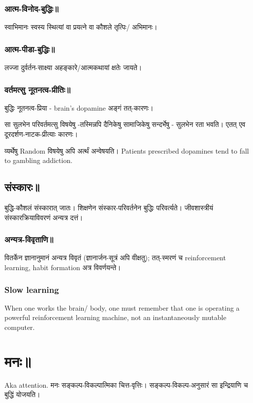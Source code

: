 \documentclass[oneside, article]{memoir}
\begin{document}
\subsection{आत्म-विनोद-बुद्धिः॥}
स्वाभिमानः स्वस्य स्थित्यां वा प्रयत्ने वा कौशले तृत्पिः/ अभिमानः।

\subsection{आत्म-पीडा-बुद्धिः॥}
लज्जा दुर्वर्तन-साक्ष्या अहङ्कारे/आत्मकथायां क्षतेः जायते।

\subsection{वर्तमत्सु नूतनत्व-प्रीतिः॥}
बुद्धिः नूतनत्व-प्रिया - brain's dopamine अङ्गं तत्-कारणः।

सा सुलभेन परिवर्तमत्सु विषयेषु -तस्मिन्नपि दैनिकेषु सामाजिकेषु सन्दर्भेषु -  सुलभेन रता भवति। एतत् एव दूरदर्शण-नाटक-प्रीत्याः कारणः।

व्यर्थेषु Random विषयेषु अपि अर्त्थं अन्वेषयति। Patients prescribed dopamines tend to fall to gambling addiction.

\section{संस्कारः॥}
बुद्धि-कौशलं संस्कारात् जातः। शिक्षणेन संस्कार-परिवर्तनेन बुद्धिः परिवर्त्यते। जीवशास्त्रीयं संस्कारक्रियाविवरणं अन्यत्र दत्तं।

\subsection{अन्यत्र-विवृताणि॥}
वितर्केन ज्ञानानुमानं अन्यत्र विवृतं (ज्ञानार्जन-सूत्रं अपि वीक्षतु); तत्-स्मरणं च reinforcement learning, habit formation अत्र विवर्णयन्ते।

\subsection{Slow learning}
When one works the brain/ body, one must remember that one is operating a powerful reinforcement learning machine, not an instantaneously mutable computer.

\chapter{मनः॥}
Aka attention. मनः सङ्कल्प-विकल्पात्मिका चित्त-वृत्तिः। सङ्कल्प-विकल्प-अनुसारं सा इन्द्रियाणि च बुद्धिं‌ योजयति।
\end{document}
